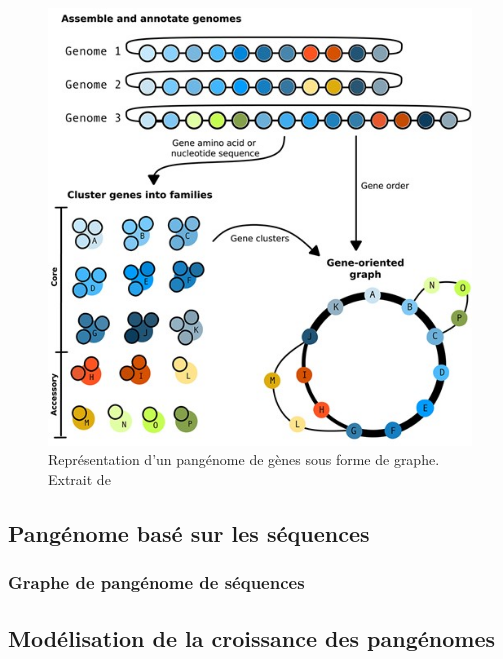 \begin{figure}[htbp]
    \centering
    \includegraphics[width=0.8\linewidth]{images/graphePanFam.jpeg}
    \caption[Représentation d'un pangénome de gènes sous forme de graphe]{Représentation d'un pangénome de gènes sous forme de graphe. Extrait de \cite{matthews_gentle_2024}}
    \label{fig:graphPanFam}
\end{figure}

\subsection{Pangénome basé sur les séquences}

\subsubsection{Graphe de pangénome de séquences}
\label{sec:graphSeq}


\subsection{Modélisation de la croissance des pangénomes}
\label{sec:croissance_pan}

